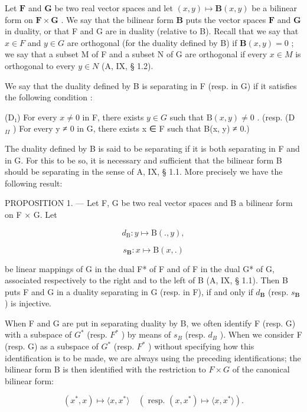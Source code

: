 Let \(\mathbf{F}\) and \(\mathbf{G}\) be two real vector spaces and let \((x, y) \mapsto \mathbf{B}(x, y)\) be a bilinear form on \(\mathbf{F} \times \mathbf{G}\) . We say that the bilinear form \(\mathbf{B}\) puts the vector spaces \(\mathbf{F}\) and \(\mathbf{G}\) in duality, or that F and G are in duality (relative to B). Recall that we say that \(x \in F\) and \(y \in G\) are orthogonal (for the duality defined by B) if \(\mathbf{B}(x, y) = 0\) ; we say that a subset M of F and a subset N of G are orthogonal if every \(x \in M\) is orthogonal to every \(y \in N\) (A, IX, § 1.2).

We say that the duality defined by B is separating in F (resp. in G) if it satisfies the following condition :

(D₁) For every \(x \neq 0\) in F, there exists \(y \in G\) such that \(\mathrm{B}(x, y) \neq 0\) . (resp. (D \(_{II}\) ) For every y ≠ 0 in G, there exists x ∈ F such that B(x, y) ≠ 0.)

The duality defined by B is said to be separating if it is both separating in F and in G. For this to be so, it is necessary and sufficient that the bilinear form B should be separating in the sense of A, IX, § 1.1. More precisely we have the following result:

PROPOSITION 1. --- Let F, G be two real vector spaces and B a bilinear form on F × G. Let

\[
d _ {\mathrm{B}}: y \mapsto \mathrm{B} (., y),
\]

\[
s _ {\mathbf {B}} \colon x \mapsto \mathrm{B} (x,.)
\]

be linear mappings of G in the dual F* of F and of F in the dual G* of G, associated respectively to the right and to the left of B (A, IX, § 1.1). Then B puts F and G in a duality separating in G (resp. in F), if and only if \(d_{\mathbf{B}}\) (resp. \(s_{\mathbf{B}}\) ) is injective.

When F and G are put in separating duality by B, we often identify F (resp. G) with a subspace of \(G^{*}\) (resp. \(F^{*}\) ) by means of \(s_{B}\) (resp. \(d_{B}\) ). When we consider F (resp. G) as a subspace of \(G^{*}\) (resp. \(F^{*}\) ) without specifying how this identification is to be made, we are always using the preceding identifications; the bilinear form B is then identified with the restriction to \(F \times G\) of the canonical bilinear form:

\[
(x ^ {*}, x) \mapsto \langle x, x ^ {*} \rangle \quad (\text { resp. } (x, x ^ {*}) \mapsto \langle x, x ^ {*} \rangle).
\]


